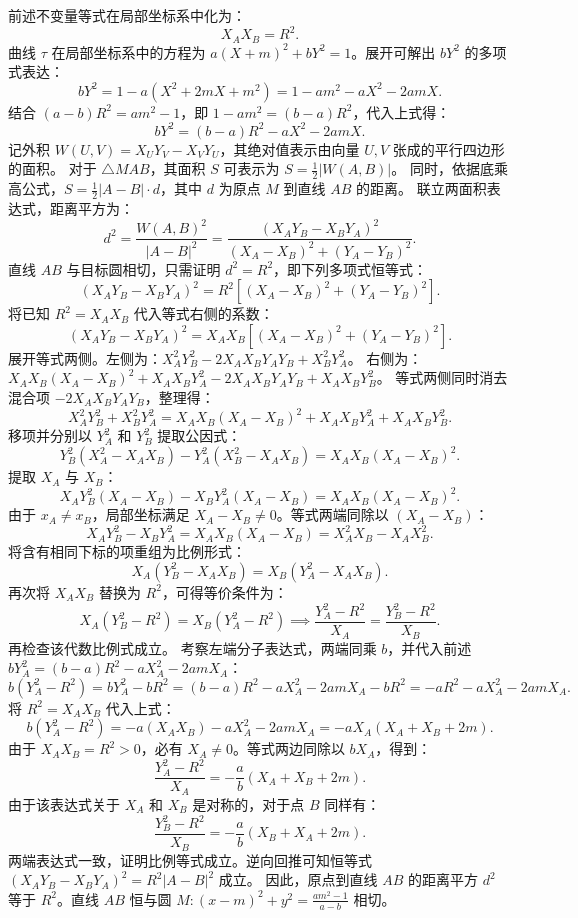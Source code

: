 \begin{solution}
前述不变量等式在局部坐标系中化为：
\[
X_A X_B = R^2.
\]
曲线 $\tau$ 在局部坐标系中的方程为 $a(X+m)^2 + bY^2 = 1$。展开可解出 $bY^2$ 的多项式表达：
\[
bY^2 = 1 - a(X^2 + 2mX + m^2) = 1 - am^2 - aX^2 - 2amX.
\]
结合 $(a - b)R^2 = am^2 - 1$，即 $1 - am^2 = (b - a)R^2$，代入上式得：
\[
bY^2 = (b - a)R^2 - aX^2 - 2amX.
\]
记外积 $W(U, V) = X_U Y_V - X_V Y_U$，其绝对值表示由向量 $U, V$ 张成的平行四边形的面积。
对于 $\triangle MAB$，其面积 $S$ 可表示为 $S = \frac{1}{2}|W(A,B)|$。
同时，依据底乘高公式，$S = \frac{1}{2}|A-B| \cdot d$，其中 $d$ 为原点 $M$ 到直线 $AB$ 的距离。
联立两面积表达式，距离平方为：
\[
d^2 = \frac{W(A,B)^2}{|A-B|^2} = \frac{(X_A Y_B - X_B Y_A)^2}{(X_A - X_B)^2 + (Y_A - Y_B)^2}.
\]
直线 $AB$ 与目标圆相切，只需证明 $d^2 = R^2$，即下列多项式恒等式：
\[
(X_A Y_B - X_B Y_A)^2 = R^2 \left[ (X_A - X_B)^2 + (Y_A - Y_B)^2 \right].
\]
将已知 $R^2 = X_A X_B$ 代入等式右侧的系数：
\[
(X_A Y_B - X_B Y_A)^2 = X_A X_B \left[ (X_A - X_B)^2 + (Y_A - Y_B)^2 \right].
\]
展开等式两侧。左侧为：$X_A^2 Y_B^2 - 2X_A X_B Y_A Y_B + X_B^2 Y_A^2$。
右侧为：$X_A X_B (X_A - X_B)^2 + X_A X_B Y_A^2 - 2X_A X_B Y_A Y_B + X_A X_B Y_B^2$。
等式两侧同时消去混合项 $-2X_A X_B Y_A Y_B$，整理得：
\[
X_A^2 Y_B^2 + X_B^2 Y_A^2 = X_A X_B (X_A - X_B)^2 + X_A X_B Y_A^2 + X_A X_B Y_B^2.
\]
移项并分别以 $Y_A^2$ 和 $Y_B^2$ 提取公因式：
\[
Y_B^2 (X_A^2 - X_A X_B) - Y_A^2 (X_B^2 - X_A X_B) = X_A X_B (X_A - X_B)^2.
\]
提取 $X_A$ 与 $X_B$：
\[
X_A Y_B^2 (X_A - X_B) - X_B Y_A^2 (X_A - X_B) = X_A X_B (X_A - X_B)^2.
\]
由于 $x_A \neq x_B$，局部坐标满足 $X_A - X_B \neq 0$。等式两端同除以 $(X_A - X_B)$：
\[
X_A Y_B^2 - X_B Y_A^2 = X_A X_B (X_A - X_B) = X_A^2 X_B - X_A X_B^2.
\]
将含有相同下标的项重组为比例形式：
\[
X_A (Y_B^2 - X_A X_B) = X_B (Y_A^2 - X_A X_B).
\]
再次将 $X_A X_B$ 替换为 $R^2$，可得等价条件为：
\[
X_A (Y_B^2 - R^2) = X_B (Y_A^2 - R^2) \implies \frac{Y_A^2 - R^2}{X_A} = \frac{Y_B^2 - R^2}{X_B}.
\]
再检查该代数比例式成立。
考察左端分子表达式，两端同乘 $b$，并代入前述 $bY_A^2 = (b - a)R^2 - aX_A^2 - 2amX_A$：
\[
b(Y_A^2 - R^2) = bY_A^2 - bR^2 = (b - a)R^2 - aX_A^2 - 2amX_A - bR^2 = -aR^2 - aX_A^2 - 2amX_A.
\]
将 $R^2 = X_A X_B$ 代入上式：
\[
b(Y_A^2 - R^2) = -a(X_A X_B) - aX_A^2 - 2amX_A = -aX_A (X_A + X_B + 2m).
\]
由于 $X_A X_B = R^2 > 0$，必有 $X_A \neq 0$。等式两边同除以 $b X_A$，得到：
\[
\frac{Y_A^2 - R^2}{X_A} = -\frac{a}{b} (X_A + X_B + 2m).
\]
由于该表达式关于 $X_A$ 和 $X_B$ 是对称的，对于点 $B$ 同样有：
\[
\frac{Y_B^2 - R^2}{X_B} = -\frac{a}{b} (X_B + X_A + 2m).
\]
两端表达式一致，证明比例等式成立。逆向回推可知恒等式 $(X_A Y_B - X_B Y_A)^2 = R^2 |A-B|^2$ 成立。
因此，原点到直线 $AB$ 的距离平方 $d^2$ 等于 $R^2$。直线 $AB$ 恒与圆 $M: (x - m)^2 + y^2 = \frac{am^2 - 1}{a - b}$ 相切。
\end{solution}



